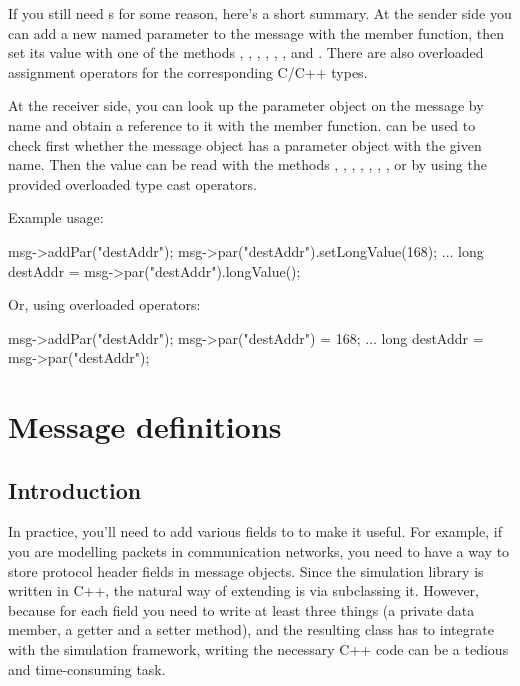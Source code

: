 If you still need s for some reason, here's a short summary.
At the sender side you can add a new named parameter to the message
with the  member function, then set its value with
one of the methods , ,
, , ,
, and . There are also overloaded
assignment operators for the corresponding C/C++ types.

At the receiver side, you can look up the parameter object on the message
by name and obtain a reference to it with the  member function.
 can be used to check first whether the message object has a parameter
object with the given name. Then the value can be read with the methods
, , ,
, , ,
, or by using the provided overloaded type cast operators.

Example usage:

\begin{cpp}
msg->addPar("destAddr");
msg->par("destAddr").setLongValue(168);
...
long destAddr = msg->par("destAddr").longValue();
\end{cpp}

Or, using overloaded operators:

\begin{cpp}
msg->addPar("destAddr");
msg->par("destAddr") = 168;
...
long destAddr = msg->par("destAddr");
\end{cpp}


\section{Message definitions}
\label{ch:messages:message-definitions}

\subsection{Introduction}

In practice, you'll need to add various fields to  to
make it useful. For example, if you are modelling packets in communication
networks, you need to have a way to store protocol header fields in message
objects. Since the simulation library is written in C++, the natural way
of extending  is via subclassing it.
However, because for each field you need to write at least
three things (a private data member, a getter and a setter method),
and the resulting class has to integrate with the simulation framework,
writing the necessary C++ code can be a tedious and time-consuming task.


